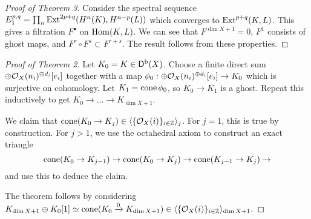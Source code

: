 \documentclass{amsart}
\begin{document}
\begin{proof}[Proof of Theorem 3]
	Consider the spectral sequence $E_1^{p,q} = \prod_n \operatorname{Ext}^{2p+q}(H^n(K), H^{n-p}(L))$ which converges to $\operatorname{Ext}^{p+q}(K, L)$.
	This gives a filtration $F^\bullet$ on $\operatorname{Hom}(K, L)$.
	We can see that $F^{\dim X + 1} = 0$, $F^1$ consists of ghost maps, and $F^r \circ F^s \subset F^{r+s}$.
	The result follows from these properties.
\end{proof}

\begin{proof}[Proof of Theorem 2]
	Let $K_0 = K \in \mathsf{D}^{\mathrm{b}}(X)$.
	Choose a finite direct sum $\oplus \mathcal{O}_X(n_i)^{\oplus d_i}[e_i]$ together with a map $\phi_0: \oplus \mathcal{O}_X(n_i)^{\oplus d_i}[e_i] \to K_0$ which is surjective on cohomology.
	Let $K_1 = \operatorname{cone} \phi_0$, so $K_0 \to K_1$ is a ghost.
	Repeat this inductively to get $K_0 \to \dots \to K_{\dim X + 1}$.
	
	We claim that $\operatorname{cone}(K_0 \to K_j) \in \langle {\{\mathcal{O}_X(i)\}_{i \in \mathbb{Z}}} \rangle_j$.
	For $j = 1$, this is true by construction.
	For $j > 1$, we use the octahedral axiom to construct an exact triangle
	\[
		\operatorname{cone}(K_0 \to K_{j-1}) \to \operatorname{cone}(K_0 \to K_j) \to \operatorname{cone}(K_{j-1} \to K_j) \to
	\]
	and use this to deduce the claim.

	The theorem follows by considering $K_{\dim X + 1} \oplus K_0[1] \simeq \operatorname{cone}(K_0 \xrightarrow{0} K_{\dim X + 1}) \in \langle {\{\mathcal{O}_X(i)\}_{i \in \mathbb{Z}}} \rangle_{\dim X + 1}$.
\end{proof}
\end{document}

